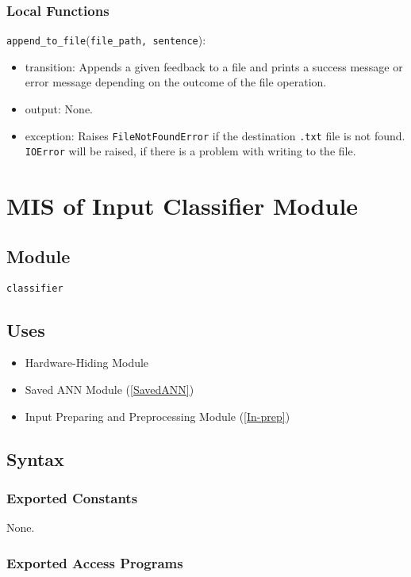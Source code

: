 \documentclass[12pt, titlepage]{article}
\def\code#1{\texttt{#1}}
\begin{document}
\subsubsection{Local Functions}
\noindent \code{append\_to\_file}(\code{file\_path, sentence}):
\begin{itemize}
  \item transition: Appends a given feedback to a file and prints a success message or error message depending on 
  the outcome of the file operation.
  \item output: None.
  \item exception: Raises \code{FileNotFoundError} if the destination \code{.txt} file is not found. 
  \code{IOError} will be raised, if there is a problem with writing to the file. 
\end{itemize}

\newpage

\section{MIS of Input Classifier Module} \label{In-class} 

\subsection{Module}
\code{classifier} 

\subsection{Uses}
\begin{itemize}
  \item Hardware-Hiding Module  
  \item Saved ANN Module (\ref{SavedANN})
  \item Input Preparing and Preprocessing Module (\ref{In-prep})
\end{itemize}


\subsection{Syntax}

\subsubsection{Exported Constants}
None.

\subsubsection{Exported Access Programs}
\end{document}
